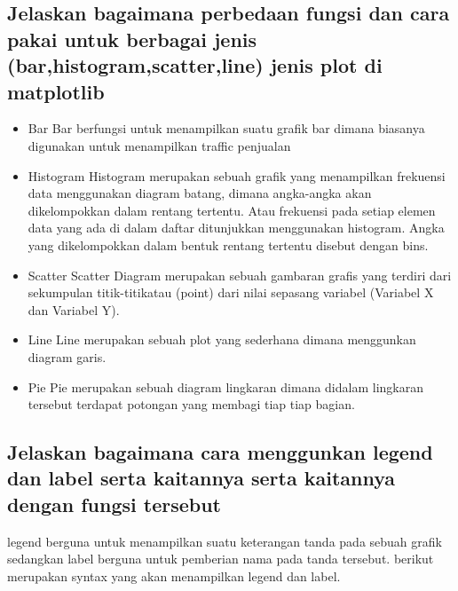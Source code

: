 \subsection {Jelaskan bagaimana perbedaan fungsi dan cara pakai untuk berbagai jenis (bar,histogram,scatter,line) jenis plot di matplotlib}
\begin{itemize}
	\item Bar \newline
	Bar berfungsi untuk menampilkan suatu grafik bar dimana biasanya digunakan untuk menampilkan traffic 			penjualan 



	\item Histogram \newline
	Histogram merupakan sebuah  grafik yang menampilkan frekuensi data menggunakan diagram batang, 			dimana angka-angka akan  dikelompokkan dalam rentang tertentu. Atau frekuensi pada  setiap elemen 			data yang ada di dalam daftar ditunjukkan menggunakan histogram. Angka yang 						dikelompokkan dalam bentuk rentang tertentu disebut dengan bins. 



	\item Scatter \newline
	Scatter Diagram merupakan sebuah gambaran grafis yang terdiri dari sekumpulan titik-titikatau  (point) dari 		nilai sepasang variabel (Variabel X dan Variabel Y).



	\item Line \newline
	Line merupakan sebuah plot yang sederhana dimana menggunkan diagram garis.



	\item Pie \newline
	Pie merupakan sebuah diagram lingkaran dimana didalam lingkaran tersebut terdapat potongan yang 			membagi tiap tiap bagian.



\end{itemize}
	
\subsection {Jelaskan bagaimana cara menggunkan legend dan label serta kaitannya serta kaitannya dengan fungsi tersebut}
legend berguna untuk menampilkan suatu keterangan tanda pada sebuah  grafik sedangkan label berguna untuk pemberian nama pada tanda tersebut. berikut merupakan syntax yang akan menampilkan legend dan label.

